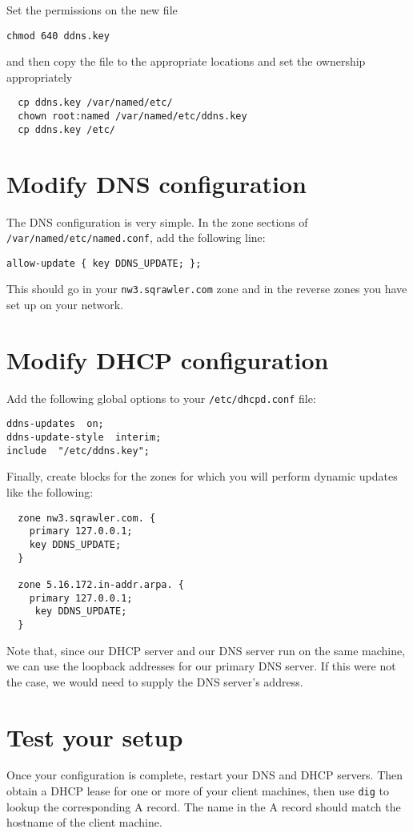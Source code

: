 \documentclass{article}
\begin{document}
Set the permissions on the new file

\texttt{chmod 640 ddns.key}

and then copy the file to the appropriate locations and set the ownership appropriately

\begin{verbatim}
  cp ddns.key /var/named/etc/
  chown root:named /var/named/etc/ddns.key
  cp ddns.key /etc/
\end{verbatim}

\section{Modify DNS configuration}
The DNS configuration is very simple.  In the zone sections of \texttt{/var/named/etc/named.conf}, add the following line:

\texttt{allow-update \{ key DDNS\_UPDATE; \};}

This should go in your \texttt{nw3.sqrawler.com} zone and in the reverse zones you have set up on your 
network.

\section{Modify DHCP configuration}
Add the following global options to your \texttt{/etc/dhcpd.conf} file:

\begin{verbatim}
ddns-updates  on;
ddns-update-style  interim;
include  "/etc/ddns.key";
\end{verbatim}

Finally, create blocks for the zones for which you will perform dynamic updates like the following:

\begin{verbatim}
  zone nw3.sqrawler.com. {
    primary 127.0.0.1;
    key DDNS_UPDATE;
  }

  zone 5.16.172.in-addr.arpa. {
    primary 127.0.0.1;
     key DDNS_UPDATE;
  }
\end{verbatim}

Note that, since our DHCP server and our DNS server run on the same machine, we can use the loopback 
addresses for our primary DNS server.  If this were not the case, we would need to supply the 
DNS server's address.

\section{Test your setup}
Once your configuration is complete, restart your DNS and DHCP servers.  Then obtain a DHCP lease for one or more of your client machines, then use \texttt{dig} to lookup the corresponding A record.  The name
in the A record should match the hostname of the client machine.
\end{document}
